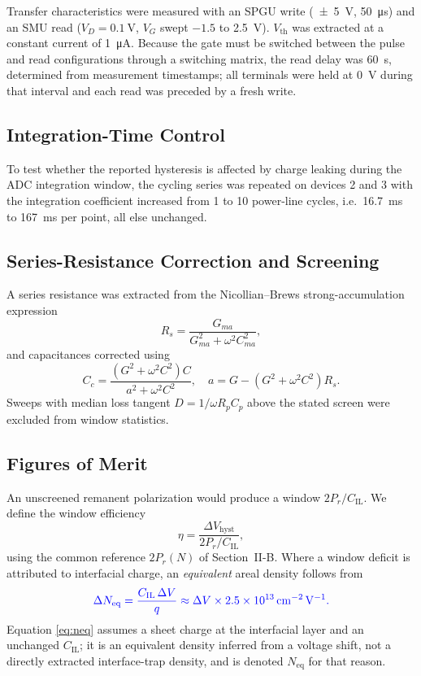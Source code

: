 \documentclass[journal]{IEEEtran}
\newcommand{\rev}[1]{{\color{blue}#1}}      %
\newcommand{\Prem}{P_r}
\newcommand{\Vth}{V_{\mathrm{th}}}
\newcommand{\Neq}{N_{\mathrm{eq}}}
\newcommand{\dVh}{\Delta V_{\mathrm{hyst}}}
\newcommand{\Cil}{C_{\mathrm{IL}}}
\newcommand{\Rs}{R_s}
\begin{document}
\rev{Transfer characteristics were measured with an SPGU write
(\SI{\pm5}{\volt}, \SI{50}{\micro\second}) and an SMU read
($V_D=\SI{0.1}{\volt}$, $V_G$ swept $-1.5$ to \SI{+2.5}{\volt}).
$\Vth$ was extracted at a constant current of \SI{1}{\micro\ampere}.
Because the gate must be switched between the pulse and read
configurations through a switching matrix, the read delay was
\SI{60}{\second}, determined from measurement timestamps; all terminals
were held at \SI{0}{\volt} during that interval and each read was
preceded by a fresh write.}

\rev{\subsection{Integration-Time Control}
To test whether the reported hysteresis is affected by charge leaking
during the ADC integration window, the cycling series was repeated on
devices 2 and 3 with the integration coefficient increased from 1 to 10
power-line cycles, i.e.\ \SI{16.7}{\milli\second} to
\SI{167}{\milli\second} per point, all else unchanged.}

\subsection{Series-Resistance Correction and Screening}
A series resistance was extracted from the Nicollian--Brews
strong-accumulation expression \cite{nicollian1982,schroder2006}
\begin{equation}
\Rs = \frac{G_{ma}}{G_{ma}^{2}+\omega^{2}C_{ma}^{2}},
\label{eq:rs}
\end{equation}
and capacitances corrected using
\begin{equation}
C_c=\frac{(G^{2}+\omega^{2}C^{2})C}{a^{2}+\omega^{2}C^{2}},\quad
a=G-(G^{2}+\omega^{2}C^{2})\Rs .
\label{eq:corr}
\end{equation}
Sweeps with median loss tangent $D=1/\omega R_pC_p$ above the stated
screen were excluded from window statistics.

\subsection{Figures of Merit}
An unscreened remanent polarization would produce a window
$2\Prem/\Cil$. We define the window efficiency
\begin{equation}
\eta = \frac{\dVh}{2\Prem/\Cil},
\label{eq:eta}
\end{equation}
\rev{using the common reference $2\Prem(N)$ of Section~II-B. Where a
window deficit is attributed to interfacial charge, an \emph{equivalent}
areal density follows from}
\begin{equation}
\rev{\Delta\Neq=\frac{\Cil\,\Delta V}{q}
 \approx\Delta V\times\SI{2.5e13}{\per\centi\meter\squared\per\volt}.}
\label{eq:neq}
\end{equation}
\rev{Equation \eqref{eq:neq} assumes a sheet charge at the interfacial
layer and an unchanged $\Cil$; it is an equivalent density inferred from
a voltage shift, not a directly extracted interface-trap density, and is
denoted $\Neq$ for that reason.}
\end{document}
